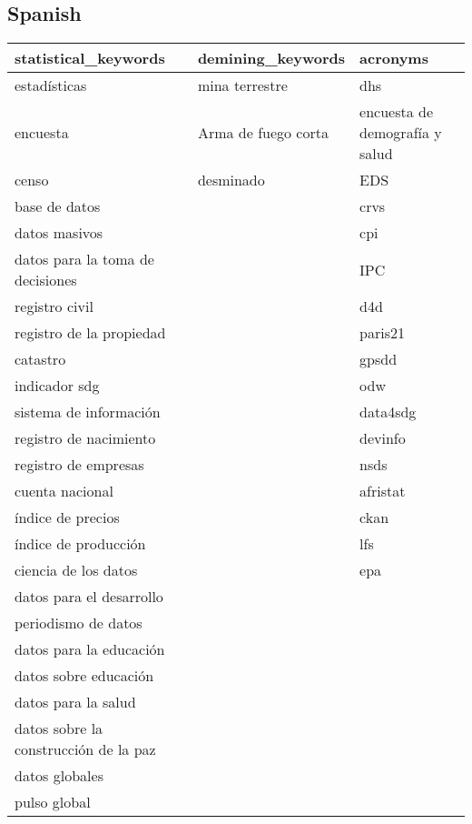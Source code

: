 \documentclass[
]{article}
\begin{document}
\hypertarget{spanish}{%
\subsection*{Spanish}\label{spanish}}

\begin{table}[H]
\centering\begingroup\fontsize{10}{12}\selectfont

\begin{tabular}{l|l|l}
\hline
statistical\_keywords & demining\_keywords & acronyms\\
\hline
estadísticas & mina terrestre & dhs\\
\hline
encuesta & Arma de fuego corta & encuesta de demografía y salud\\
\hline
censo & desminado & EDS\\
\hline
base de datos &  & crvs\\
\hline
datos masivos &  & cpi\\
\hline
datos para la toma de decisiones &  & IPC\\
\hline
registro civil &  & d4d\\
\hline
registro de la propiedad &  & paris21\\
\hline
catastro &  & gpsdd\\
\hline
indicador sdg &  & odw\\
\hline
sistema de información &  & data4sdg\\
\hline
registro de nacimiento &  & devinfo\\
\hline
registro de empresas &  & nsds\\
\hline
cuenta nacional &  & afristat\\
\hline
índice de precios &  & ckan\\
\hline
índice de producción &  & lfs\\
\hline
ciencia de los datos &  & epa\\
\hline
datos para el desarrollo &  & \\
\hline
periodismo de datos &  & \\
\hline
datos para la educación &  & \\
\hline
datos sobre educación &  & \\
\hline
datos para la salud &  & \\
\hline
datos sobre la construcción de la paz &  & \\
\hline
datos globales &  & \\
\hline
pulso global &  & \\

\end{tabular}
\end{table}
\end{document}
